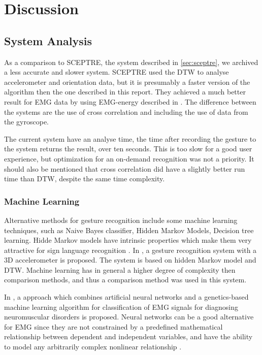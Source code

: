 \chapter{Discussion}
\label{chap:discussion}

\section{System Analysis}
As a comparison to SCEPTRE, the system described in \cref{sec:sceptre}, we archived a less accurate and slower system. SCEPTRE used the DTW to analyse accelerometer and orientation data, but it is presumably a faster version of the algorithm then the one described in this report. They achieved a much better result for EMG data by using EMG-energy described in \cite{paudyal2016sceptre}. The difference between the systems are the use of cross correlation and including the use of data from the gyroscope.

The current system have an analyse time, the time after recording the gesture to the system returns the result, over ten seconds. This is too slow for a good user experience, but optimization for an on-demand recognition was not a priority. It should also be mentioned that cross correlation did have a slightly better run time than DTW, despite the same time complexity.

\subsection{Machine Learning}
Alternative methods for gesture recognition include some machine learning techniques, such as Naive Bayes classifier, Hidden Markov Models, Decision tree learning. Hidde Markov models have intrinsic properties which make them very attractive for sign language recognition \cite{starner1997real}. In \cite{wu2009gesture}, a gesture recognition system with a 3D accelerometer is proposed. The system is based on hidden Markov model and DTW. Machine learning has in general a higher degree of complexity then comparison methods, and thus a comparison method was used in this system. 

In \cite{pattichis1996genetics}, a approach which combines artificial neural networks  and a genetics-based machine learning algorithm for classification of EMG signals for diagnosing neuromuscular disorders is proposed. Neural networks can be a good alternative for EMG since they are not constrained by a predefined mathematical relationship between dependent and independent variables, and have the ability to model any arbitrarily complex nonlinear relationship \cite{tu1996advantages}. 

